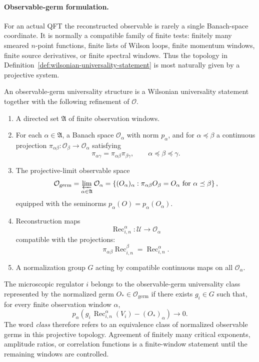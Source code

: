 \paragraph{Observable-germ formulation.}
For an actual QFT the reconstructed observable is rarely a single Banach-space
coordinate.  It is normally a compatible family of finite tests: finitely
many smeared \(n\)-point functions, finite lists of Wilson loops, finite
momentum windows, finite source derivatives, or finite spectral windows.
Thus the topology in
Definition~\ref{def:wilsonian-universality-statement} is most naturally
given by a projective system.

\begin{definition}
\label{def:observable-germ-universality-class}
An observable-germ universality structure is a Wilsonian universality statement
together with the following refinement of \(\mathcal O\).
\begin{enumerate}
  \item A directed set \(\mathfrak A\) of finite observation windows.
  \item For each \(\alpha\in\mathfrak A\), a Banach space
  \(\mathcal O_\alpha\) with norm \(p_\alpha\), and for
  \(\alpha\preceq\beta\) a continuous projection
  \(\pi_{\alpha\beta}:\mathcal O_\beta\to\mathcal O_\alpha\) satisfying
  \[
    \pi_{\alpha\gamma}
    =
    \pi_{\alpha\beta}\pi_{\beta\gamma},
    \qquad
    \alpha\preceq\beta\preceq\gamma .
  \]
  \item The projective-limit observable space
  \[
    \mathcal O_{\mathrm{germ}}
    =
    \varprojlim_{\alpha\in\mathfrak A}\mathcal O_\alpha
    =
    \left\{
      (O_\alpha)_\alpha:\pi_{\alpha\beta}O_\beta=O_\alpha
      \text{ for }\alpha\preceq\beta
    \right\},
  \]
  equipped with the seminorms \(p_\alpha(O)=p_\alpha(O_\alpha)\).
  \item Reconstruction maps
  \[
    \operatorname{Rec}_{i,n}^{\alpha}:
    \mathcal U\longrightarrow\mathcal O_\alpha
  \]
  compatible with the projections:
  \[
    \pi_{\alpha\beta}\operatorname{Rec}_{i,n}^{\beta}
    =
    \operatorname{Rec}_{i,n}^{\alpha}.
  \]
  \item A normalization group \(G\) acting by compatible continuous maps on
  all \(\mathcal O_\alpha\).
\end{enumerate}
The microscopic regulator \(i\) belongs to the observable-germ universality
class represented by the normalized germ \(O_\ast\in\mathcal O_{\mathrm{germ}}\)
if there exists \(g_i\in G\) such that, for every finite observation window
\(\alpha\),
\begin{equation}
  p_\alpha\!\left(
    g_i\,\operatorname{Rec}_{i,n}^{\alpha}(V_i)
    -
    (O_\ast)_\alpha
  \right)
  \longrightarrow0 .
  \label{eq:observable-germ-universality-convergence}
\end{equation}
The word \emph{class} therefore refers to an equivalence class of normalized
observable germs in this projective topology.  Agreement of finitely many
critical exponents, amplitude ratios, or correlation functions is a
finite-window statement until the remaining windows are controlled.
\end{definition}

